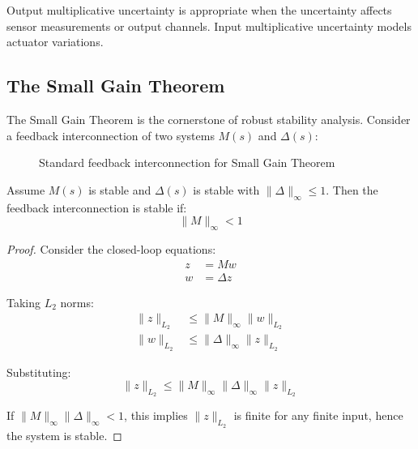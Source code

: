Output multiplicative uncertainty is appropriate when the uncertainty affects sensor measurements or output channels. Input multiplicative uncertainty models actuator variations.

\subsection{The Small Gain Theorem}
\label{subsec:small_gain}

The Small Gain Theorem is the cornerstone of robust stability analysis. Consider a feedback interconnection of two systems $M(s)$ and $\Delta(s)$:

\begin{figure}[htbp]
\centering
{}
\caption{Standard feedback interconnection for Small Gain Theorem}
\label{fig:small_gain}
\end{figure}

\begin{theorem}
\label{thm:small_gain}
Assume $M(s)$ is stable and $\Delta(s)$ is stable with $\|\Delta\|_\infty \leq 1$. Then the feedback interconnection is stable if:
\begin{equation}
\|M\|_\infty < 1
\label{eq:small_gain}
\end{equation}
\end{theorem}

\begin{proof}
Consider the closed-loop equations:
\begin{align}
z &= M w \\
w &= \Delta z
\end{align}

Taking $L_2$ norms:
\begin{align}
\|z\|_{L_2} &\leq \|M\|_\infty \|w\|_{L_2} \\
\|w\|_{L_2} &\leq \|\Delta\|_\infty \|z\|_{L_2}
\end{align}

Substituting:
\begin{equation}
\|z\|_{L_2} \leq \|M\|_\infty \|\Delta\|_\infty \|z\|_{L_2}
\end{equation}

If $\|M\|_\infty \|\Delta\|_\infty < 1$, this implies $\|z\|_{L_2}$ is finite for any finite input, hence the system is stable.
\end{proof}

